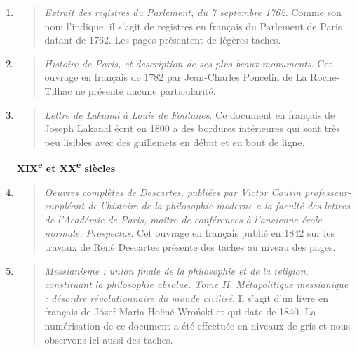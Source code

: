 \documentclass[a4paper,12pt,twoside]{book}
\begin{document}
\begin{enumerate}
\begin{quote}
\end{quote}	
\item
\begin{quote}
	
	\emph{Extrait des registres du Parlement, du 7 septembre 1762}. Comme son nom l'indique, il s'agit de registres en français du Parlement de Paris datant de 1762. Les pages présentent de légères taches.
	
\end{quote}	
\item
\begin{quote}
	
	\emph{Histoire de Paris, et description de ses plus beaux monuments}.
	Cet ouvrage en français de 1782 par Jean-Charles         
	Poncelin de La Roche-Tilhac ne présente aucune particularité.
	
\end{quote}	
\item
\begin{quote}
	
	\emph{Lettre de Lakanal à Louis de Fontanes}.
	Ce document en français de Joseph Lakanal écrit en 1800 a des bordures intérieures qui sont très peu lisibles avec des guillemets en début et en bout de ligne. \\
	
	\end{quote}	

	
	
	\textbf{XIX\textsuperscript{e} et XX\textsuperscript{e} siècles} \\
	

		
	\item
	\begin{quote}
	
	\emph{Oeuvres complètes de Descartes, publiées par Victor Cousin professeur-suppléant de l'histoire de la philosophie moderne a la faculté des lettres de l'Académie de Paris, maître de conférences à l'ancienne école normale. Prospectus}.
	Cet ouvrage en français publié en 1842 sur les travaux de René Descartes présente des taches au niveau des pages.
	
\end{quote}	
\item
\begin{quote}
	
	\emph{Messianisme : union finale de la philosophie et de la religion, constituant la philosophie absolue. Tome II. Métapolitique messianique : désordre révolutionnaire du monde civilisé}.
	Il s'agit d'un livre en français de Józef Maria Hoëné-Wroński et qui date de 1840. La numérisation de ce document a été effectuée en niveaux de gris et nous observons ici aussi des taches.
	

\end{quote}
\end{enumerate}
\end{document}
